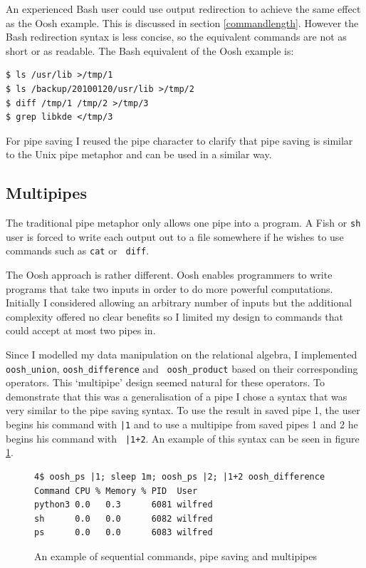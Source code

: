 \documentclass[12pt,twoside,notitlepage]{report}
\begin{document}
An experienced Bash user could use output redirection to achieve the
same effect as the Oosh example. This is discussed in section
\ref{commandlength}. However the Bash redirection syntax is less
concise, so the equivalent commands are not as short or as
readable. The Bash equivalent of the Oosh example is:

\begin{verbatim}
$ ls /usr/lib >/tmp/1
$ ls /backup/20100120/usr/lib >/tmp/2
$ diff /tmp/1 /tmp/2 >/tmp/3
$ grep libkde </tmp/3
\end{verbatim}

For pipe saving I reused the pipe character to clarify that pipe
saving is similar to the Unix pipe metaphor and can be used in a
similar way.

\subsection{Multipipes}

The traditional pipe metaphor only allows one pipe into a program. A
Fish or {\tt sh} user is forced to write each output out to a file
somewhere if he wishes to use commands such as {\tt cat} or {\tt
  diff}.

The Oosh approach is rather different. Oosh enables programmers to
write programs that take two inputs in order to do more powerful
computations. Initially I considered allowing an arbitrary number of
inputs but the additional complexity offered no clear benefits so I
limited my design to commands that could accept at most two pipes in.

Since I modelled my data manipulation on the relational algebra, I
implemented {\tt oosh\_union}, {\tt oosh\_difference} and {\tt
  oosh\_product} based on their corresponding operators. This
`multipipe' design seemed natural for these operators. To demonstrate
that this was a generalisation of a pipe I chose a syntax that was
very similar to the pipe saving syntax. To use the result in saved
pipe 1, the user begins his command with {\tt |1} and to use a
multipipe from saved pipes 1 and 2 he begins his command with {\tt
  |1+2}. An example of this syntax can be seen in figure \ref{multipipe}.

\begin{figure}[h]
\begin{verbatim}
4$ oosh_ps |1; sleep 1m; oosh_ps |2; |1+2 oosh_difference
Command CPU % Memory % PID  User
python3 0.0   0.3      6081 wilfred
sh      0.0   0.0      6082 wilfred
ps      0.0   0.0      6083 wilfred
\end{verbatim}
\caption{An example of sequential commands, pipe saving and
  multipipes}
\label{multipipe}
\end{figure}
\end{document}

